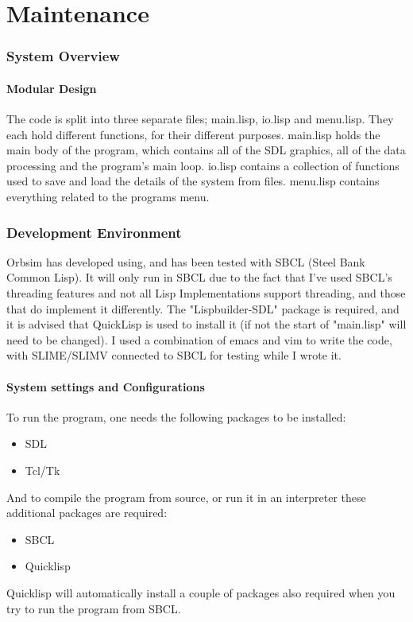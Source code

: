 \part{Maintenance}

\section{System Overview}
\subsection{Modular Design}
The code is split into three separate files; main.lisp, io.lisp and menu.lisp.
They each hold different functions, for their different purposes. main.lisp
holds the main body of the program, which contains all of the SDL graphics, all
of the data processing and the program's main loop. io.lisp contains a
collection of functions used to save and load the details of the system from
files. menu.lisp contains everything related to the programs menu.

\section{Development Environment}
Orbsim has developed using, and has been tested with SBCL (Steel Bank Common
Lisp). It will only run in SBCL due to the fact that I've used SBCL's threading
features and not all Lisp Implementations support threading, and those that do
implement it differently. The "Lispbuilder-SDL" package is required, and it is
advised that QuickLisp is used to install it (if not the start of "main.lisp"
will need to be changed). I used a combination of emacs and vim to write the
code, with SLIME/SLIMV connected to SBCL for testing while I wrote it.

\subsection{System settings and Configurations}
To run the program, one needs the following packages to be installed:
\begin{itemize}
	\item SDL
	\item Tcl/Tk
\end{itemize}
And to compile the program from source, or run it in an interpreter  these
additional packages are required:
\begin{itemize}
	\item SBCL
	\item Quicklisp	
\end{itemize}
Quicklisp will automatically install a couple of packages also required when you
try to run the program from SBCL.

